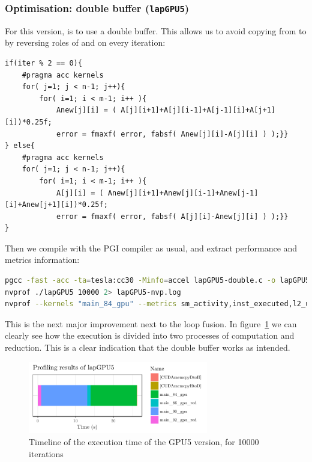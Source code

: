 \subsubsection{Optimisation: double buffer (\texttt{lapGPU5})}
For this version, is to use a double buffer. This allows us to avoid copying from  to  by reversing roles of  and  on every iteration:
\begin{lstlisting}[firstnumber=81]
if(iter % 2 == 0){
	#pragma acc kernels
	for( j=1; j < n-1; j++){
		for( i=1; i < m-1; i++ ){
			Anew[j][i] = ( A[j][i+1]+A[j][i-1]+A[j-1][i]+A[j+1][i])*0.25f;
			error = fmaxf( error, fabsf( Anew[j][i]-A[j][i] ) );}}
} else{
	#pragma acc kernels
	for( j=1; j < n-1; j++){
		for( i=1; i < m-1; i++ ){
			A[j][i] = ( Anew[j][i+1]+Anew[j][i-1]+Anew[j-1][i]+Anew[j+1][i])*0.25f;
			error = fmaxf( error, fabsf( A[j][i]-Anew[j][i] ) );}}
}
\end{lstlisting}

Then we compile with the PGI compiler as usual, and extract performance and metrics information:
\begin{lstlisting}[language=bash]
pgcc -fast -acc -ta=tesla:cc30 -Minfo=accel lapGPU5-double.c -o lapGPU5 &> lapGPU5-comp.log
nvprof ./lapGPU5 10000 2> lapGPU5-nvp.log
nvprof --kernels "main_84_gpu" --metrics sm_activity,inst_executed,l2_utilization, dram_utilization,dram_read_throughput,dram_write_throughput,ipc ./lapGPU5 100 2> lapGPU5-metrics.log
\end{lstlisting}

This is the next major improvement next to the loop fusion. In figure~\ref{fig:timeline-gpu5} we can clearly see how the execution is divided into two processes of computation and reduction. This is a clear indication that the double buffer works as intended.
\begin{figure}[H]
	\centering
	\includegraphics[width=0.7\textwidth]{images/timeline-gpu5}
	\caption{Timeline of the execution time of the GPU5 version, for \num{10000} iterations}
	\label{fig:timeline-gpu5}
\end{figure}

